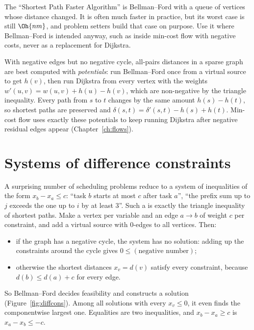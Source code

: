 \begin{fact}[SPFA]
The ``Shortest Path Faster Algorithm'' is Bellman--Ford with a queue of vertices whose distance changed. It is often much
faster in practice, but its worst case is still $\Oh{nm}$, and problem setters build that case on purpose. Use it where
Bellman--Ford is intended anyway, such as inside min-cost flow with negative costs, never as a replacement for Dijkstra.
\end{fact}

\begin{trick}
With negative edges but no negative cycle, all-pairs distances in a sparse graph are best computed with \emph{potentials}: run
Bellman--Ford once from a virtual source to get $h(v)$, then run Dijkstra from every vertex with the weights
$w'(u, v) = w(u, v) + h(u) - h(v)$, which are non-negative by the triangle inequality. Every path from $s$ to $t$ changes by the
same amount $h(s) - h(t)$, so shortest paths are preserved and $\delta(s, t) = \delta'(s, t) - h(s) + h(t)$. Min-cost flow uses
exactly these potentials to keep running Dijkstra after negative residual edges appear (Chapter~\ref{ch:flows}).
\end{trick}

\section[Difference constraints]{Systems of difference constraints \hfill \plat}\label{sec:diffcons}

A surprising number of scheduling problems reduce to a system of inequalities of the form $x_b - x_a \le c$: ``task $b$ starts
at most $c$ after task $a$'', ``the prefix sum up to $j$ exceeds the one up to $i$ by at least 3''. Such a  is exactly the triangle inequality of shortest paths. Make a vertex per variable and an edge
$a \to b$ of weight $c$ per constraint, and add a virtual source with 0-edges to all vertices. Then:
\begin{itemize}
  \item if the graph has a negative cycle, the system has no solution: adding up the constraints around the cycle gives
        $0 \le (\text{negative number})$;
  \item otherwise the shortest distances $x_v = d(v)$ satisfy every constraint, because $d(b) \le d(a) + c$ for every edge.
\end{itemize}
So Bellman--Ford decides feasibility and constructs a solution (Figure~\ref{fig:diffcons}). Among all solutions with every
$x_v \le 0$, it even finds the componentwise largest one. Equalities are two inequalities, and $x_b - x_a \ge c$ is
$x_a - x_b \le -c$.

